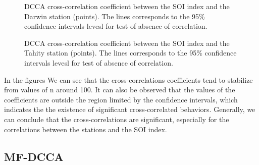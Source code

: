 \documentclass[onecolumn, preprint,aps,amsmath, amssymb, superscriptaddress]{revtex4}
\begin{document}
\begin{figure}
\caption{DCCA cross-correlation coefficient between the SOI index and the Darwin station (points). The lines corresponds to the 95\% confidence intervals levesl for test of absence of correlation.}
\label{fig:rho_dar_soi}
\end{figure}

\begin{figure}
\caption{DCCA cross-correlation coefficient between the SOI index and the Tahity station (points). The lines corresponds to the 95\% confidence intervals levesl for test of absence of correlation. }
\label{fig:rho_tah_soi}
\end{figure}

In the figures We can see that the cross-correlations coefficients tend to stabilize from values of n around 100. It can also be observed that the values of the coefficients are outside the region limited by the confidence intervals, which indicates the the existence of significant cross-correlated behaviors. Generally, we can conclude that the cross-correlations are significant, especially for the correlations between the stations and the SOI index.

\subsection{MF-DCCA}
\label{results_mfdcca}
\end{document}
